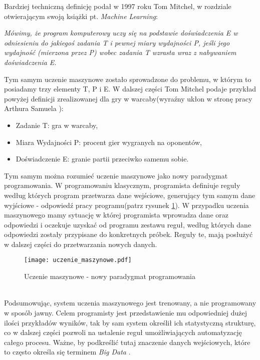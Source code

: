 Bardziej techniczną definicję podał w 1997 roku Tom Mitchel, w rozdziale otwierającym swoją książki pt. \textit{Machine Learning}:
\begin{center}
	\textit{Mówimy, że program komputerowy uczy się na podstawie doświadczenia E w 	odniesieniu do jakiegoś zadania T i pewnej miary wydajności P, jeśli jego wydajność (mierzona przez P) wobec zadania T wzrasta wraz z nabywaniem doświadczenia E.} \cite{mitchell}
\end{center}
Tym samym uczenie maszynowe zostało sprowadzone do problemu, w którym to posiadamy trzy elementy T, P i E. W dalszej części Tom Mitchel podaje przykład powyżej definicji zrealizowanej dla gry w warcaby(wyraźny ukłon w stronę pracy Arthura Samuela \cite{samuel}):
\begin{itemize}
	\item Zadanie T: gra w warcaby,
	\item Miara Wydajności P: procent gier wygranych na oponentów,
	\item Doświadczenie E: granie partii przeciwko samemu sobie.\\
\end{itemize}

Tym samym można rozumieć uczenie maszynowe jako nowy paradygmat programowania. W programowaniu klasycznym, programista definiuje reguły według których program przetwarza dane wejściowe, generujący tym samym dane wyjściowe - odpowiedź pracy programu(patrz rysunek \ref{fig:uczenie_maszynowe}). W przypadku uczenia maszynowego mamy sytuację w której programista wprowadza dane oraz odpowiedzi i oczekuje uzyskać od programu zestawu reguł, według których dane odpowiedzi zostały przypisane do konkretnych próbek. Reguły te, mają posłużyć w dalszej części do przetwarzania nowych danych.
\begin{figure}[h!]
	\texttt{[image: uczenie\_maszynowe.pdf]}
	\centering
	\caption{Uczenie maszynowe - nowy paradygmat programowania}
	\label{fig:uczenie_maszynowe}
\end{figure}
\\

Podsumowując, system uczenia maszynowego jest trenowany, a nie programowany w sposób jawny. Celem programisty jest przedstawienie mu odpowiedniej dużej ilości przykładów wyników, tak by sam system określił ich statystyczną strukturę, co w dalszej części pozwoli na ustalenie reguł umożliwiających automatyzację całego procesu. Ważne, by podkreślić tutaj znaczenie danych wejściowych, które to często określa się terminem \textit{Big Data} \cite{big_data}.

